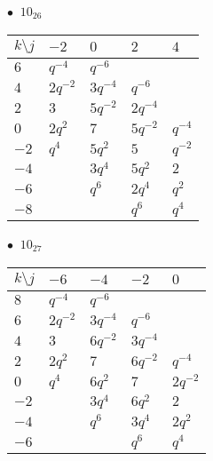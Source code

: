\begin{minipage}{\linewidth}
$\bullet\ $ $10_{26}$ \vspace{0.5em} \\
\begin{tabular}{l|llll}
$k \setminus j$ & $-2$ & $0$ & $2$ & $4$ \\
\hline
$6$ & $q^{-4}$ & $q^{-6}$ &  &  \\
$4$ & $2q^{-2}$ & $3q^{-4}$ & $q^{-6}$ &  \\
$2$ & $3$ & $5q^{-2}$ & $2q^{-4}$ &  \\
$0$ & $2q^{2}$ & $7$ & $5q^{-2}$ & $q^{-4}$ \\
$-2$ & $q^{4}$ & $5q^{2}$ & $5$ & $q^{-2}$ \\
$-4$ &  & $3q^{4}$ & $5q^{2}$ & $2$ \\
$-6$ &  & $q^{6}$ & $2q^{4}$ & $q^{2}$ \\
$-8$ &  &  & $q^{6}$ & $q^{4}$ \\
\end{tabular}
\vspace{2em}
\end{minipage}
%
\begin{minipage}{\linewidth}
$\bullet\ $ $10_{27}$ \vspace{0.5em} \\
\begin{tabular}{l|llll}
$k \setminus j$ & $-6$ & $-4$ & $-2$ & $0$ \\
\hline
$8$ & $q^{-4}$ & $q^{-6}$ &  &  \\
$6$ & $2q^{-2}$ & $3q^{-4}$ & $q^{-6}$ &  \\
$4$ & $3$ & $6q^{-2}$ & $3q^{-4}$ &  \\
$2$ & $2q^{2}$ & $7$ & $6q^{-2}$ & $q^{-4}$ \\
$0$ & $q^{4}$ & $6q^{2}$ & $7$ & $2q^{-2}$ \\
$-2$ &  & $3q^{4}$ & $6q^{2}$ & $2$ \\
$-4$ &  & $q^{6}$ & $3q^{4}$ & $2q^{2}$ \\
$-6$ &  &  & $q^{6}$ & $q^{4}$ \\
\end{tabular}
\vspace{2em}
\end{minipage}
%
